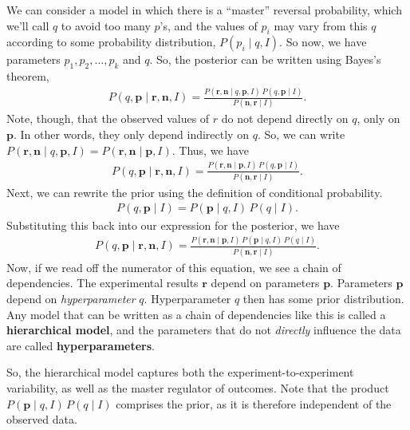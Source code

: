 We can consider a model in which there is a ``master'' reversal
probability, which we'll call $q$ to avoid too many $p$'s, and the
values of $p_i$ may vary from this $q$ according to some probability
distribution, $P(p_i\mid q, I)$.  So now, we have parameters
$p_1, p_2, \ldots, p_k$ and $q$.  So, the posterior can be written
using Bayes's theorem,
\begin{align}
P(q,\mathbf{p}\mid \mathbf{r}, \mathbf{n}, I)
= \frac{P(\mathbf{r},\mathbf{n}\mid q, \mathbf{p}, I)\,
P(q, \mathbf{p}\mid I)}{P(\mathbf{n}, \mathbf{r}\mid I)}.
\end{align}
Note, though, that the observed values of $r$ do not depend directly
on $q$, only on $\mathbf{p}$.  In other words, they only depend
indirectly on $q$.  So, we can write
$P(\mathbf{r},\mathbf{n}\mid q, \mathbf{p}, I) =
P(\mathbf{r},\mathbf{n}\mid \mathbf{p}, I)$.  Thus, we have
\begin{align}
P(q,\mathbf{p}\mid \mathbf{r}, \mathbf{n}, I)
= \frac{P(\mathbf{r},\mathbf{n}\mid \mathbf{p}, I)\,
P(q, \mathbf{p}\mid I)}{P(\mathbf{n}, \mathbf{r}\mid I)}.
\end{align}
Next, we can rewrite the prior using the definition of conditional
probability.
\begin{align}
P(q,\mathbf{p}\mid I) = P(\mathbf{p}\mid q,I)\, P(q\mid I).
\end{align}
Substituting this back into our expression for the posterior, we have
\begin{align}
P(q,\mathbf{p}\mid \mathbf{r}, \mathbf{n}, I)
= \frac{P(\mathbf{r},\mathbf{n}\mid \mathbf{p}, I)\,
P(\mathbf{p}\mid q,I)\, P(q\mid I)}{P(\mathbf{n}, \mathbf{r}\mid I)}.
\end{align}
Now, if we read off the numerator of this equation, we see a chain of
dependencies.  The experimental results $\mathbf{r}$ depend on
parameters $\mathbf{p}$.  Parameters $\mathbf{p}$ depend on
\textit{hyperparameter} $q$.  Hyperparameter $q$ then has some prior
distribution.  Any model that can be written as a chain of
dependencies like this is called a \textbf{hierarchical model}, and
the parameters that do not \textit{directly} influence the data are called
\textbf{hyperparameters}.

So, the hierarchical model captures both the experiment-to-experiment
variability, as well as the master regulator of outcomes.  Note that
the product $P(\mathbf{p}\mid q,I)\, P(q\mid I)$ comprises the prior,
as it is therefore independent of the observed data.


